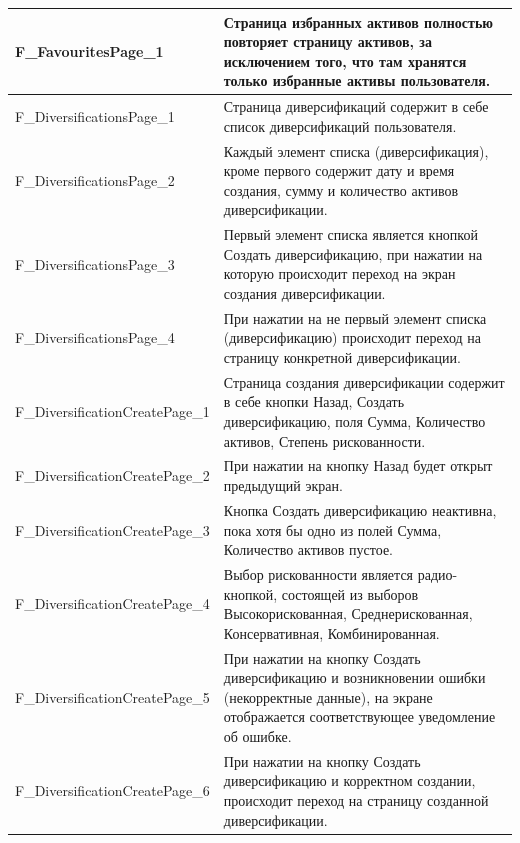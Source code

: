 \documentclass[a4paper, 14pt]{article}
\begin{document}
\begin{longtable}{| p{} | p{} |}
    F\_FavouritesPage\_1            & Страница избранных активов полностью повторяет страницу активов, за исключением того, что там хранятся только избранные активы пользователя.                                       \\ \hline

    F\_DiversificationsPage\_1      & Страница диверсификаций содержит в себе список диверсификаций пользователя.                                                                                                        \\ \hline
    F\_DiversificationsPage\_2      & Каждый элемент списка (диверсификация), кроме первого содержит дату и время создания, сумму и количество активов диверсификации.                                                   \\ \hline
    F\_DiversificationsPage\_3      & Первый элемент списка является кнопкой Создать диверсификацию, при нажатии на которую происходит переход на экран создания диверсификации.                                         \\ \hline
    F\_DiversificationsPage\_4      & При нажатии на не первый элемент списка (диверсификацию) происходит переход на страницу конкретной диверсификации.                                                                 \\ \hline

    F\_DiversificationCreatePage\_1 & Страница создания диверсификации содержит в себе кнопки Назад, Создать диверсификацию, поля Сумма, Количество активов, Степень рискованности.                                      \\ \hline
    F\_DiversificationCreatePage\_2 & При нажатии на кнопку Назад будет открыт предыдущий экран.                                                                                                                         \\ \hline
    F\_DiversificationCreatePage\_3 & Кнопка Создать диверсификацию неактивна, пока хотя бы одно из полей Сумма, Количество активов пустое.                                                                              \\ \hline
    F\_DiversificationCreatePage\_4 & Выбор рискованности является радио-кнопкой, состоящей из выборов Высокорискованная, Среднерискованная, Консервативная, Комбинированная.                                            \\ \hline
    F\_DiversificationCreatePage\_5 & При нажатии на кнопку Создать диверсификацию и возникновении ошибки (некорректные данные), на экране отображается соответствующее уведомление об ошибке.                           \\ \hline
    F\_DiversificationCreatePage\_6 & При нажатии на кнопку Создать диверсификацию и корректном создании, происходит переход на страницу созданной диверсификации.                                                       \\ \hline


\end{longtable}
\end{document}
